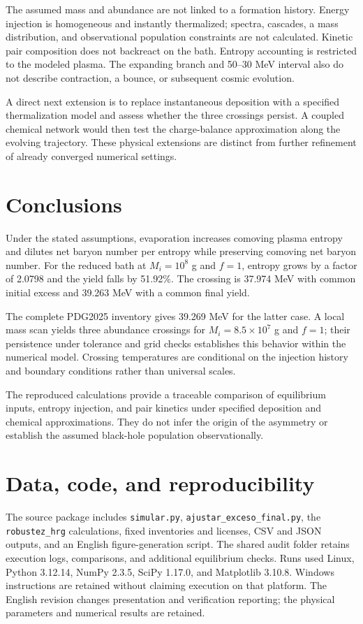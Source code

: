 \documentclass[10pt,a4paper,twocolumn]{article}
\begin{document}
The assumed mass and abundance are not linked to a formation history. Energy injection is homogeneous and instantly thermalized; spectra, cascades, a mass distribution, and observational population constraints are not calculated. Kinetic pair composition does not backreact on the bath. Entropy accounting is restricted to the modeled plasma. The expanding branch and 50--30 MeV interval also do not describe contraction, a bounce, or subsequent cosmic evolution.

A direct next extension is to replace instantaneous deposition with a specified thermalization model and assess whether the three crossings persist. A coupled chemical network would then test the charge-balance approximation along the evolving trajectory. These physical extensions are distinct from further refinement of already converged numerical settings.

\section{Conclusions}
Under the stated assumptions, evaporation increases comoving plasma entropy and dilutes net baryon number per entropy while preserving comoving net baryon number. For the reduced bath at $M_i=10^8$ g and $f=1$, entropy grows by a factor of 2.0798 and the yield falls by 51.92\%. The crossing is 37.974 MeV with common initial excess and 39.263 MeV with a common final yield.

The complete PDG2025 inventory gives 39.269 MeV for the latter case. A local mass scan yields three abundance crossings for $M_i=8.5\times10^7$ g and $f=1$; their persistence under tolerance and grid checks establishes this behavior within the numerical model. Crossing temperatures are conditional on the injection history and boundary conditions rather than universal scales.

The reproduced calculations provide a traceable comparison of equilibrium inputs, entropy injection, and pair kinetics under specified deposition and chemical approximations. They do not infer the origin of the asymmetry or establish the assumed black-hole population observationally.

\balance
\section*{Data, code, and reproducibility}
The source package includes \texttt{simular.py}, \texttt{ajustar\_exceso\_final.py}, the \texttt{robustez\_hrg} calculations, fixed inventories and licenses, CSV and JSON outputs, and an English figure-generation script. The shared audit folder retains execution logs, comparisons, and additional equilibrium checks. Runs used Linux, Python 3.12.14, NumPy 2.3.5, SciPy 1.17.0, and Matplotlib 3.10.8. Windows instructions are retained without claiming execution on that platform. The English revision changes presentation and verification reporting; the physical parameters and numerical results are retained.
\end{document}

